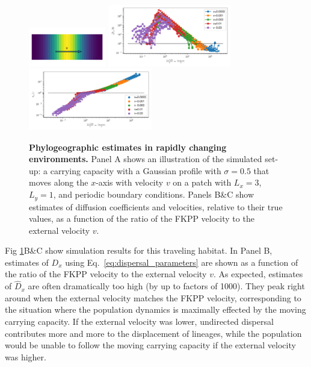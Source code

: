 \documentclass[aps,rmp, twocolumn]{revtex4}
\begin{document}
\begin{figure}
    \includegraphics[width=0.3\textwidth]{figures/traveling_wave}
    \includegraphics[width=0.48\textwidth]{figures/waves_D}
    \includegraphics[width=0.48\textwidth]{figures/waves_v}
    \caption{\label{fig:traveling_wave} {\bf Phylogeographic estimates in rapidly changing environments.} Panel A shows an illustration of the simulated set-up: a carrying capacity with a Gaussian profile with $\sigma=0.5$ that moves along the $x$-axis with velocity $v$ on a patch with $L_x=3$, $L_y=1$, and periodic boundary conditions.
    Panels B\&C show estimates of diffusion coefficients and velocities, relative to their true values, as a function of the ratio of the FKPP velocity to the external velocity $v$. }
\end{figure}


Fig \ref{fig:traveling_wave}B\&C show simulation results for this traveling habitat. In Panel B, estimates of $D_x$ using Eq.~\ref{eq:dispersal_parameters} are shown as a function of the ratio of the FKPP velocity to the external velocity $v$.
As expected, estimates of $\hat{D}_x$ are often dramatically too high (by up to factors of 1000).
They peak right around when the external velocity matches the FKPP velocity, corresponding to the situation where the population dynamics is maximally effected by the moving carrying capacity.
If the external velocity was lower, undirected dispersal contributes more and more to the displacement of lineages, while the population would be unable to follow the moving carrying capacity if the external velocity was higher.
\end{document}
